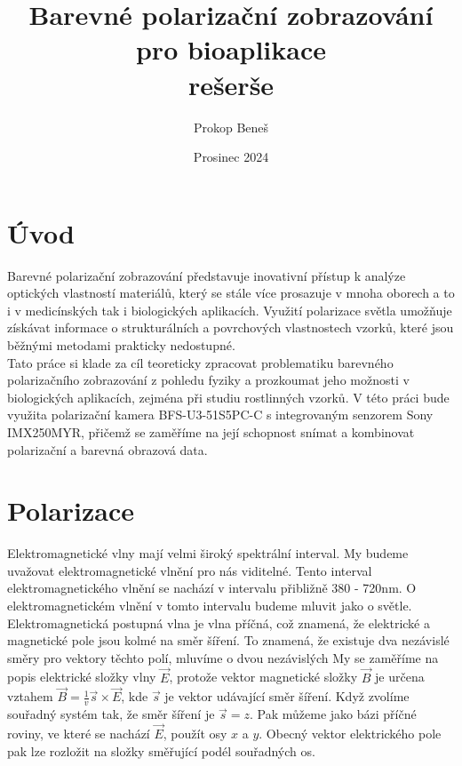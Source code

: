 \documentclass[a4paper]{article}
\title{Barevné polarizační zobrazování pro bioaplikace \\rešerše}
\author{Prokop Beneš}
\date{Prosinec 2024}
\numberwithin{equation}{section}
\begin{document}
	\maketitle
	\newpage

	\tableofcontents
	\newpage

    \section{Úvod}
    Barevné polarizační zobrazování představuje inovativní přístup k analýze optických vlastností materiálů,
    který se stále více prosazuje v mnoha oborech a to i v medicínských tak i biologických aplikacích.
    Využití polarizace světla umožňuje získávat informace o strukturálních a povrchových vlastnostech vzorků,
    které jsou běžnými metodami prakticky nedostupné. \cite{photonics}
    \\Tato práce si klade za cíl teoreticky zpracovat problematiku barevného polarizačního zobrazování z
    pohledu fyziky a prozkoumat jeho možnosti v biologických aplikacích, zejména při studiu rostlinných vzorků.
    V této práci bude využita polarizační kamera BFS-U3-51S5PC-C s integrovaným senzorem Sony IMX250MYR,
    přičemž se zaměříme na její schopnost snímat a kombinovat polarizační a barevná obrazová data. \cite{flir}\cite{teledyne}\cite{senzor}
	\newpage
        
	\section{Polarizace}
    Elektromagnetické vlny mají velmi široký spektrální interval. My budeme uvažovat elektromagnetické vlnění
    pro nás viditelné. Tento interval elektromagnetického vlnění se nachází v intervalu přibližně 380 - 720nm.
    O elektromagnetickém vlnění v tomto intervalu budeme mluvit jako o světle. \cite{maly}
    \\Elektromagnetická postupná vlna je vlna příčná, což znamená, že elektrické a magnetické pole jsou kolmé
    na směr šíření. To znamená, že existuje dva nezávislé směry pro vektory těchto polí, mluvíme o dvou
    nezávislých My se zaměříme na popis elektrické složky vlny $\vec{E}$, protože vektor magnetické složky
    $\vec{B}$ je určena vztahem $\vec{B}= \frac{1}{v}\vec{s}\times\vec{E}$, kde $\vec{s}$ je vektor udávající
    směr šíření. Když zvolíme souřadný systém tak, že směr šíření je $\vec{s}=z$. Pak můžeme jako bázi příčné
    roviny, ve které se nachází $\vec{E}$, použít osy $x$ a $y$. Obecný vektor elektrického pole pak lze
    rozložit na složky směřující podél souřadných os.
\end{document}
